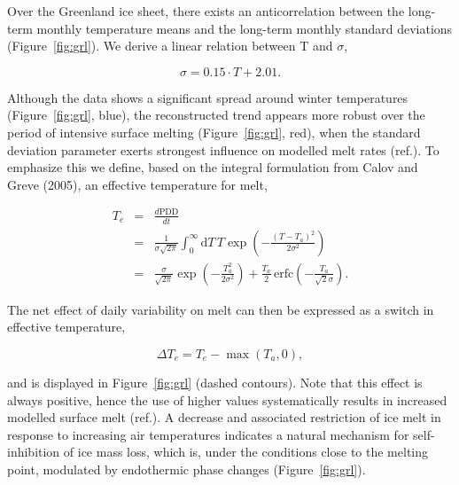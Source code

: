 \documentclass[review]{igs}
\begin{document}
Over the Greenland ice sheet, there exists an anticorrelation between the long-term monthly temperature means and the long-term monthly standard deviations (Figure~\ref{fig:grl}). We derive a linear relation between T and $\sigma$,

\begin{equation}
    \sigma = 0.15 \cdot T + 2.01.
\end{equation}

Although the data shows a significant spread around winter temperatures (Figure~\ref{fig:grl}, blue), the reconstructed trend appears more robust over the period of intensive surface melting (Figure~\ref{fig:grl}, red), when the standard deviation parameter exerts strongest influence on modelled melt rates (ref.). To emphasize this we define, based on the integral formulation from Calov and Greve (2005), an effective temperature for melt,

\begin{eqnarray} \label{eq:calovgreve}
    T_e &=& \frac{d\mathrm{PDD}}{dt}\\
        &=& \frac{1}{\sigma\sqrt{2\pi}}
            \int_{0}^{\infty} \mathrm{d}T \, T \exp\left({-\frac{(T-T_a)^2}{2\sigma^2}}\right)\\
        &=& \frac{\sigma}{\sqrt{2\pi}} \exp\left({-\frac{T_a^2}{2\sigma^2}}\right)
            + \frac{T_a}{2} \, \mathrm{erfc} \left(-\frac{T_a}{\sqrt{2}\sigma}\right).
\end{eqnarray}

The net effect of daily variability on melt can then be expressed as a switch in effective temperature,

\begin{equation}
    \Delta T_e = T_e - \max(T_a, 0),
\end{equation}

and is displayed in Figure~\ref{fig:grl} (dashed contours). Note that this effect is always positive, hence the use of higher values systematically results in increased modelled surface melt (ref.). A decrease and associated restriction of ice melt in response to increasing air temperatures indicates a natural mechanism for self-inhibition of ice mass loss, which is, under the conditions close to the melting point, modulated by endothermic phase changes (Figure~\ref{fig:grl}).
\end{document}
